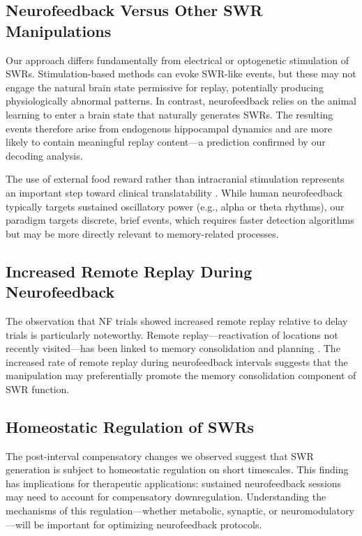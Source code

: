 \documentclass[11pt]{article}
\begin{document}
\subsection{Neurofeedback Versus Other SWR Manipulations}

Our approach differs fundamentally from electrical or optogenetic stimulation of SWRs. Stimulation-based methods can evoke SWR-like events, but these may not engage the natural brain state permissive for replay, potentially producing physiologically abnormal patterns. In contrast, neurofeedback relies on the animal learning to enter a brain state that naturally generates SWRs. The resulting events therefore arise from endogenous hippocampal dynamics and are more likely to contain meaningful replay content---a prediction confirmed by our decoding analysis.

The use of external food reward rather than intracranial stimulation represents an important step toward clinical translatability \citep{sitaram2017}. While human neurofeedback typically targets sustained oscillatory power (e.g., alpha or theta rhythms), our paradigm targets discrete, brief events, which requires faster detection algorithms but may be more directly relevant to memory-related processes.

\subsection{Increased Remote Replay During Neurofeedback}

The observation that NF trials showed increased remote replay relative to delay trials is particularly noteworthy. Remote replay---reactivation of locations not recently visited---has been linked to memory consolidation and planning \citep{carr2011,foster2006}. The increased rate of remote replay during neurofeedback intervals suggests that the manipulation may preferentially promote the memory consolidation component of SWR function.

\subsection{Homeostatic Regulation of SWRs}

The post-interval compensatory changes we observed suggest that SWR generation is subject to homeostatic regulation on short timescales. This finding has implications for therapeutic applications: sustained neurofeedback sessions may need to account for compensatory downregulation. Understanding the mechanisms of this regulation---whether metabolic, synaptic, or neuromodulatory---will be important for optimizing neurofeedback protocols.
\end{document}
